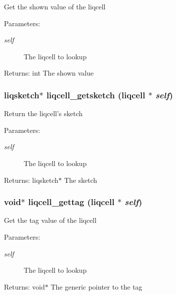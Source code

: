 Get the shown value of the liqcell \begin{Desc}
\item[Parameters:]
\begin{description}
\item[{\em self}]The liqcell to lookup \end{description}
\end{Desc}
\begin{Desc}
\item[Returns:]int The shown value \end{Desc}
\subsubsection[{liqcell\_\-getsketch}]{\setlength{\rightskip}{0pt plus 5cm}liqsketch$\ast$ liqcell\_\-getsketch (liqcell $\ast$ {\em self})}\label{d5/da2/liqcell_8c_2657173c159673ce98822085c34aa78e}


Return the liqcell's sketch \begin{Desc}
\item[Parameters:]
\begin{description}
\item[{\em self}]The liqcell to lookup \end{description}
\end{Desc}
\begin{Desc}
\item[Returns:]liqsketch$\ast$ The sketch \end{Desc}
\subsubsection[{liqcell\_\-gettag}]{\setlength{\rightskip}{0pt plus 5cm}void$\ast$ liqcell\_\-gettag (liqcell $\ast$ {\em self})}\label{d5/da2/liqcell_8c_7955aea284456771a26a189e944a73d8}


Get the tag value of the liqcell \begin{Desc}
\item[Parameters:]
\begin{description}
\item[{\em self}]The liqcell to lookup \end{description}
\end{Desc}
\begin{Desc}
\item[Returns:]void$\ast$ The generic pointer to the tag \end{Desc}


